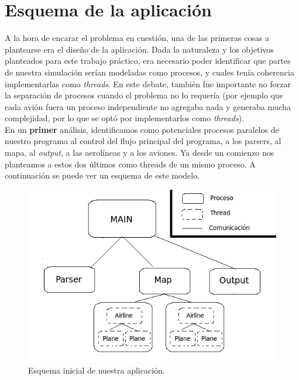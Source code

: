 \documentclass[a4paper,10pt]{article}
\begin{document}
\newpage
\section{Esquema de la aplicación}

A la hora de encarar el problema en cuestión, una de las primeras cosas a plantearse era el diseño de la aplicación. Dada la naturaleza y los objetivos planteados 
para este trabajo práctico, era necesario poder identificar que partes de nuestra simulación serían modeladas como procesos, y cuales tenía coherencia implementarlas 
como \textit{threads}. En este debate, también fue importante no forzar la separación de procesos cuando el problema no lo requería (por ejemplo que cada avión 
fuera un proceso independiente no agregaba nada y generaba mucha complejidad, por lo que se optó por implementarlos como \textit{threads}).\\ 

En un \textbf{primer} análisis, identificamos como potenciales procesos paralelos de nuestro programa al control del flujo principal del programa, a los parsers, 
al mapa, al \textit{output}, a las aerolíneas y a los aviones. Ya desde un comienzo nos planteamos a estos
dos últimos como threads de un mismo proceso. A continuación se puede ver un esquema de este modelo.\\

\begin{figure}[H]
\begin{center}
 \includegraphics[scale=0.6]{./images/Diagrama_simulacion_2.png}
 \caption{Esquema inicial de nuestra aplicación.}
\end{center}
\end{figure}
\end{document}
